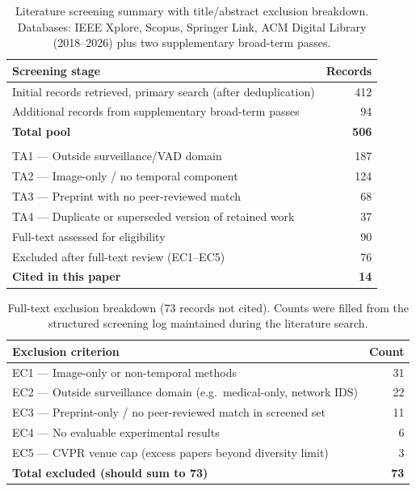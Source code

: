 \documentclass[a4paper,fleqn]{cas-dc}
\begin{document}
\begin{table}[!ht]
\caption{Literature screening summary with title/abstract exclusion breakdown. Databases: IEEE Xplore, Scopus, Springer Link, ACM Digital Library (2018--2026) plus two supplementary broad-term passes.}
\label{tab:prisma}
\centering
\small
\setlength{\tabcolsep}{5pt}
\begin{tabularx}{\linewidth}{@{}>{\raggedright\arraybackslash}X r@{}}
\toprule
\textbf{Screening stage} & \textbf{Records} \\
\midrule
Initial records retrieved, primary search (after deduplication) & 412 \\
Additional records from supplementary broad-term passes         & 94  \\
\textbf{Total pool}                                            & \textbf{506} \\
\midrule
\multicolumn{2}{l}{\textit{Title/abstract exclusions (416 records total)}} \\
\quad TA1 --- Outside surveillance/VAD domain                  & 187 \\
\quad TA2 --- Image-only / no temporal component               & 124 \\
\quad TA3 --- Preprint with no peer-reviewed match             & 68  \\
\quad TA4 --- Duplicate or superseded version of retained work & 37  \\
\midrule
Full-text assessed for eligibility                              & 90  \\
Excluded after full-text review (EC1--EC5)                      & 76  \\
\textbf{Cited in this paper}                                   & \textbf{14} \\
\bottomrule
\end{tabularx}
\vspace{0.5em}

\end{table}

\begin{table}[!ht]
\centering
\small
\caption{Full-text exclusion breakdown (73 records not cited). Counts were filled from the structured screening log maintained during the literature search.}
\label{tab:prisma-exclusions}
\begin{tabularx}{\linewidth}{X r}
\toprule
\textbf{Exclusion criterion} & \textbf{Count} \\
\midrule
EC1 --- Image-only or non-temporal methods & 31 \\
EC2 --- Outside surveillance domain (e.g.\ medical-only, network IDS) & 22 \\
EC3 --- Preprint-only / no peer-reviewed match in screened set & 11 \\
EC4 --- No evaluable experimental results & 6 \\
EC5 --- CVPR venue cap (excess papers beyond diversity limit) & 3 \\
\midrule
\textbf{Total excluded (should sum to 73)} & \textbf{73} \\
\bottomrule
\end{tabularx}
\end{table}
 
\end{document}
